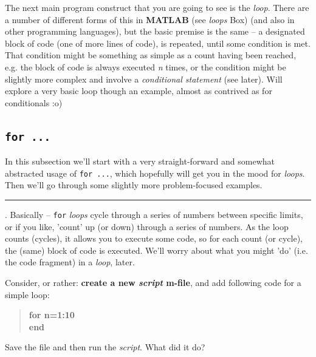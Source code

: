 \documentclass{tufte-book} %
\newenvironment{docspecbold}{\begin{quotation}\ttfamily\bfseries\parskip0pt\parindent0pt\ignorespaces}{\end{quotation}}
\begin{document}
The next main program construct that you are going to see is the \textit{loop}.
 There are a number of different forms of this in \textbf{MATLAB} (see \textit{loops} Box)  (and also in other programming languages), but the basic premise is the same -- a designated block of code (one of more lines of code), is repeated, until some condition is met. That condition might be something as simple as a count having been reached, e.g. the block of code is always executed  \textit{n} times, or the condition might be slightly more complex and involve a \textit{conditional statement} (see later). Will explore a very basic loop though an example, almost as contrived as for conditionals :o)


\subsection{\texttt{for ...}}

In this subsection we'll start with a very straight-forward and somewhat abstracted usage of \texttt{for ...}, which hopefully will get you in the mood for \textit{loops}. Then we'll go through some slightly more problem-focused examples.

\vspace{1mm}
\noindent\rule{4cm}{0.5pt}
\vspace{-2mm}

. Basically -- \texttt{for} \textit{loops} cycle through a series of numbers between specific limits, or if you like, 'count' up (or down) through a series of numbers. As the loop counts (cycles), it allows you to execute some code, so for each count (or cycle), the (same) block of code is executed. We'll worry about what you might 'do' (i.e. the code fragment) in a \textit{loop}, later.

Consider, or rather: \textbf{create a new \textit{script} \textsf{m-file}}, and add following  code for a simple loop:
\begin{docspecbold}
for n=1:10
\\end
\end{docspecbold}
Save the file and then run the \textit{script}. What did it do?
\end{document}
